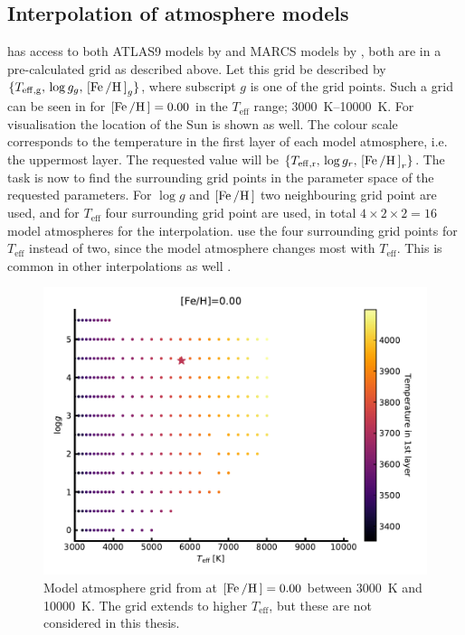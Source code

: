 \subsection{Interpolation of atmosphere models}
\label{sec:interpolation}

 has access to both ATLAS9 models by \citet{Kurucz1993} and MARCS models by
\citet{Gustafson2008}, both are in a pre-calculated grid as described above. Let this grid be
described by $\{T_\mathrm{eff,g},\, \log g_g,\, [\ion{Fe}/\ion{H}]_g\}$, where subscript $g$ is one
of the grid points. Such a grid can be seen in  for $[\ion{Fe}/\ion{H}]=0.00$ in the
$T_\mathrm{eff}$ range; \SIrange{3000}{10000}{K}. For visualisation the location of the Sun is
shown as well. The colour scale corresponds to the temperature in the first layer of each model
atmosphere, i.e. the uppermost layer. The requested value will be $\{T_\mathrm{eff,r},\,\log
g_r,\,[\ion{Fe}/\ion{H}]_r\}$. The task is now to find the surrounding grid points in the parameter
space of the requested parameters. For $\log g$ and $[\ion{Fe}/\ion{H}]$ two neighbouring grid point
are used, and for $T_\mathrm{eff}$ four surrounding grid point are used, in total
$4\times2\times2=16$ model atmospheres for the interpolation.  use the four surrounding
grid points for $T_\mathrm{eff}$ instead of two, since the model atmosphere changes most with
$T_\mathrm{eff}$. This is common in other interpolations as well \citep[see e.g.][]{Valenti1996}.

\begin{figure}[htpb!]
    \centering
    \includegraphics[width=0.85\linewidth]{figures/model_atmosphere.pdf}
    \caption{Model atmosphere grid from \citet{Kurucz1993} at $[\ion{Fe}/\ion{H}]=0.00$ between
             \SI{3000}{K} and \SI{10000}{K}. The grid extends to higher $T_\mathrm{eff}$, but these
             are not considered in this thesis.}
    \label{fig:grid}
\end{figure}

